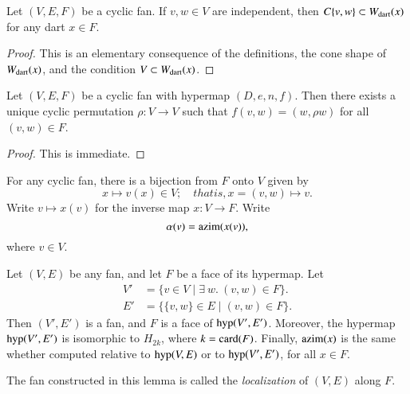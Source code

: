 \begin{lemma}  Let $(V,E,F)$ be a cyclic fan.   If $v,w\in V$ are independent, then $C\{v,w\} \subset W_{\text{dart}}(x)$ for any dart $x\in F$.
\end{lemma}

\begin{proof}  This is an elementary consequence of the definitions, the cone shape of $W_{\text{dart}}(x)$,  and the condition $V\subset W_{\text{dart}}(x)$.
\end{proof}

\begin{lemma}  Let $(V,E,F)$ be a cyclic fan with hypermap $(D,e,n,f)$.  Then there exists a unique cyclic permutation $\rho:V\to V$ such that
$f(v,w) = (w,\rho w)$ for all $(v,w)\in F$.
\end{lemma}

\begin{proof}  This is immediate.
\end{proof}

For any cyclic fan, there is a bijection from $F$ onto $V$ given by
$$x\mapsto v(x)\in V;\quad{that is, }  x = (v,w) \mapsto v.$$  
Write $v\mapsto x(v)$ for the inverse map $x:V\to F$.  Write
$$
\alpha(v) = {\operatorname{azim}}(x(v)),
$$
where $v\in V$.



\begin{lemma}[localization]\label{lemma:localization}  
Let $(V,E)$ be any fan, and let $F$ be a face of its hypermap.  
Let 
$$
\begin{array}{rll}
V' &= \{v\in V \mid \exists~w.~(v,w)\in F\}.\\
E' &= \{\{v,w\} \in E\mid (v,w)\in F\}.
\end{array}
$$
Then $(V',E')$ is a fan, and $F$ is a face of ${\operatorname{hyp}}(V',E')$.  Moreover, the hypermap ${\operatorname{hyp}}(V',E')$ is isomorphic
to $H_{2k}$, where $k= {\operatorname{card}}(F)$.
 Finally, ${\operatorname{azim}}(x)$ is the same
whether computed relative to ${\operatorname{hyp}}(V,E)$ or to ${\operatorname{hyp}}(V',E')$, for all $x\in F$.
\end{lemma}

\begin{definition}[localization]  The fan constructed in this lemma is called the {\it localization} of $(V,E)$ along $F$.
\end{definition}

